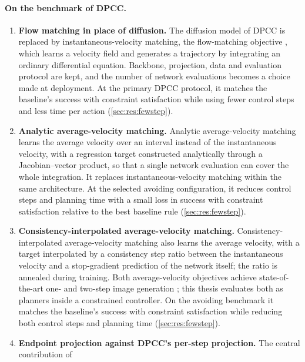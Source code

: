 \documentclass[headsepline,footsepline,footinclude=false,oneside,fontsize=11pt,paper=a4,listof=totoc,bibliography=totoc]{scrbook}
\theoremstyle{definition}
\theoremstyle{plain}
\theoremstyle{remark}
\begin{document}
\paragraph{On the benchmark of \ac{DPCC}.}
\begin{enumerate}
  \item \textbf{Flow matching in place of diffusion.} The diffusion model of \ac{DPCC}
    \parencite{romer2025diffusion} is replaced by instantaneous-velocity matching, the flow-matching
    objective \parencite{lipman2023flow,lipman2024guide}, which learns a velocity field and generates a
    trajectory by integrating an ordinary differential equation. Backbone, projection, data and
    evaluation protocol are kept, and the number of network evaluations becomes a choice made at
    deployment.
    At the primary DPCC protocol, it matches the baseline's success with constraint satisfaction
    while using fewer control steps and less time per action (\autoref{sec:res:fewstep}).
  \item \textbf{Analytic average-velocity matching.} Analytic average-velocity matching
    \parencite{geng2025meanflow} learns the average velocity over an interval instead of the
    instantaneous velocity, with a regression target constructed analytically through a
    Jacobian--vector product, so that a single network evaluation can cover the whole integration. It
    replaces instantaneous-velocity matching within the same architecture.
    At the selected avoiding configuration, it reduces control steps and planning time with a small
    loss in success with constraint satisfaction relative to the best baseline rule
    (\autoref{sec:res:fewstep}).
  \item \textbf{Consistency-interpolated average-velocity matching.} Consistency-interpolated
    average-velocity matching \parencite{zhang2025alphaflow} also learns the average velocity, with a
    target interpolated by a consistency step ratio between the instantaneous velocity and a
    stop-gradient prediction of the network itself; the ratio is annealed during training. Both
    average-velocity objectives achieve state-of-the-art one- and two-step image generation
    \parencite{geng2025meanflow,zhang2025alphaflow}; this thesis evaluates both as planners inside a
    constrained controller.
    On the avoiding benchmark it matches the baseline's success with constraint satisfaction
    while reducing both control steps and planning time (\autoref{sec:res:fewstep}).
  \item \textbf{Endpoint projection against DPCC's per-step projection.} The central contribution of

\end{enumerate}
\end{document}
